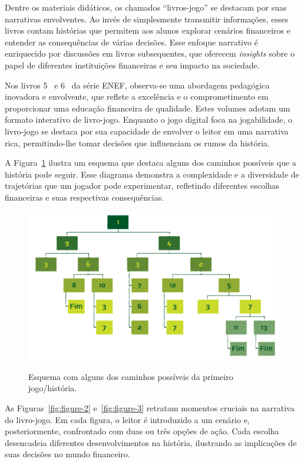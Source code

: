 Dentre os materiais didáticos, os chamados ``livros-jogo'' se destacam por suas narrativas envolventes. Ao invés de simplesmente transmitir informações, esses livros contam histórias que permitem aos alunos explorar cenários financeiros e entender as consequências de várias decisões. Esse enfoque narrativo é enriquecido por discussões em livros subsequentes, que oferecem \textit{insights} sobre o papel de diferentes instituições financeiras e seu impacto na sociedade.

Nos livros 5~\cite{Livro_ENEF_5_Ano} e 6~\cite{Livro_ENEF_6_Ano} da série ENEF, observa-se uma abordagem pedagógica inovadora e envolvente, que reflete a excelência e o comprometimento em proporcionar uma educação financeira de qualidade. Estes volumes adotam um formato interativo de livro-jogo. Enquanto o jogo digital foca na jogabilidade, o livro-jogo se destaca por sua capacidade de envolver o leitor em uma narrativa rica, permitindo-lhe tomar decisões que influenciam os rumos da história.

A Figura~\ref{fig:figure-1} ilustra um esquema que destaca alguns dos caminhos possíveis que a história pode seguir. Esse diagrama demonstra a complexidade e a diversidade de trajetórias que um jogador pode experimentar, refletindo diferentes escolhas financeiras e suas respectivas consequências.

\begin{figure}[ht]
	\centering
	\caption{Esquema com alguns dos caminhos possíveis da primeiro jogo/história.}
	\includegraphics[scale=0.25]{Textuais/Pictures/Picture1.png}
	\label{fig:figure-1}
\end{figure}

As Figuras~\ref{fig:figure-2} e~\ref{fig:figure-3} retratam momentos cruciais na narrativa do livro-jogo. Em cada figura, o leitor é introduzido a um cenário e, posteriormente, confrontado com duas ou três opções de ação. Cada escolha desencadeia diferentes desenvolvimentos na história, ilustrando as implicações de suas decisões no mundo financeiro.

